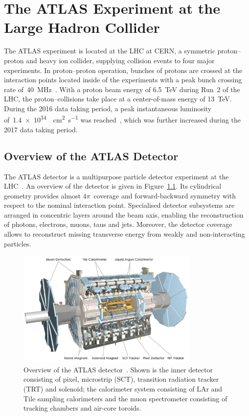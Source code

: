 \chapter{The ATLAS Experiment at the Large Hadron Collider}
\label{chap:atlas}

The ATLAS experiment is located at the LHC at CERN, a symmetric proton--proton
and heavy ion collider, supplying collision events to four major experiments. In
proton--proton operation, bunches of protons are crossed at the interaction
points located inside of the experiments with a peak bunch crossing rate
of~\SI{40}{\mega\hertz}~\cite{lhc}. With a proton beam energy of \SI{6.5}{\TeV}
during Run~2 of the LHC, the proton--collisions take place at a center-of-mass
energy of \SI{13}{\TeV}. During the 2016 data taking period, a peak
instantaneous luminosity of~\SI{1.4e34}{\per\square\centi\metre\per\second} was
reached~\cite{lhc_2016_report}, which was further increased during the 2017 data
taking period.

\section{Overview of the ATLAS Detector}
\label{sec:atlas}

The ATLAS detector is a multipurpose particle detector experiment at the
LHC~\cite{atlas_detector}. An overview of the detector is given in
Figure~\ref{fig:atlas_detector}. Its cylindrical geometry provides almost
$4\pi$~coverage and forward-backward symmetry with respect to the nominal
interaction point. Specialised detector subsystems are arranged in concentric
layers around the beam axis, enabling the reconstruction of photons, electrons,
muons, taus and jets. Moreover, the detector coverage allows to reconstruct
missing transverse energy from weakly and non-interacting particles.

\begin{figure}[htb]
  \centering
  \includegraphics[width=0.8\textwidth]{./figures/atlas/overview.jpg}
  \caption[Overview of the ATLAS detector]{Overview of the ATLAS
    detector~\cite{atlas_detector}. Shown is the inner detector consisting of
    pixel, microstrip (SCT), transition radiation tracker (TRT) and solenoid;
    the calorimeter system consisting of LAr and Tile sampling calorimeters and
    the muon spectrometer consisting of tracking chambers and air-core toroids.}
  \label{fig:atlas_detector}
\end{figure}

